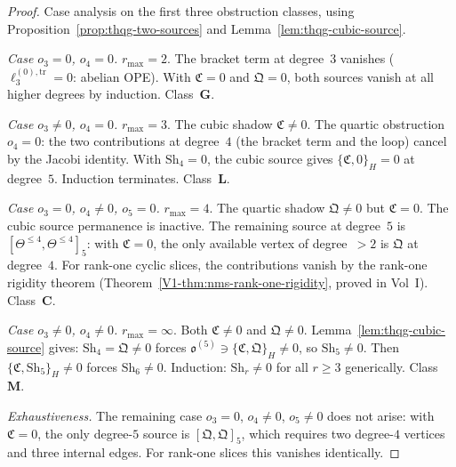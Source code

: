 \begin{proof}
Case analysis on the first three obstruction classes, using
Proposition~\ref{prop:thqg-two-sources} and
Lemma~\ref{lem:thqg-cubic-source}.

\smallskip
\noindent\emph{Case $o_3 = 0$, $o_4 = 0$.}
$r_{\max} = 2$. The bracket term at degree~$3$ vanishes
($\ell_3^{(0),\mathrm{tr}} = 0$: abelian OPE).
With $\mathfrak{C} = 0$ and $\mathfrak{Q} = 0$, both
sources vanish at all higher degrees by induction.
Class~$\mathbf{G}$.

\smallskip
\noindent\emph{Case $o_3 \neq 0$, $o_4 = 0$.}
$r_{\max} = 3$. The cubic shadow $\mathfrak{C} \neq 0$.
The quartic obstruction $o_4 = 0$: the two contributions
at degree~$4$ (the bracket term and the loop) cancel by
the Jacobi identity. With $\mathrm{Sh}_4 = 0$, the cubic
source gives $\{\mathfrak{C}, 0\}_H = 0$ at degree~$5$.
Induction terminates. Class~$\mathbf{L}$.

\smallskip
\noindent\emph{Case $o_3 = 0$, $o_4 \neq 0$, $o_5 = 0$.}
$r_{\max} = 4$. The quartic shadow $\mathfrak{Q} \neq 0$
but $\mathfrak{C} = 0$. The cubic source permanence is
inactive. The remaining source at degree~$5$ is
$[\Theta^{\leq 4}, \Theta^{\leq 4}]_5$: with
$\mathfrak{C} = 0$, the only available vertex of
degree~$> 2$ is $\mathfrak{Q}$ at degree~$4$. For
rank-one cyclic slices, the contributions vanish by the
rank-one rigidity theorem (Theorem~\ref{V1-thm:nms-rank-one-rigidity},
proved in Vol~I\@).
Class~$\mathbf{C}$.

\smallskip
\noindent\emph{Case $o_3 \neq 0$, $o_4 \neq 0$.}
$r_{\max} = \infty$. Both $\mathfrak{C} \neq 0$ and
$\mathfrak{Q} \neq 0$.
Lemma~\ref{lem:thqg-cubic-source} gives:
$\mathrm{Sh}_4 = \mathfrak{Q} \neq 0$ forces
$\mathfrak{o}^{(5)} \ni \{\mathfrak{C}, \mathfrak{Q}\}_H
\neq 0$, so $\mathrm{Sh}_5 \neq 0$. Then
$\{\mathfrak{C}, \mathrm{Sh}_5\}_H \neq 0$ forces
$\mathrm{Sh}_6 \neq 0$. Induction: $\mathrm{Sh}_r \neq 0$
for all $r \geq 3$ generically. Class~$\mathbf{M}$.

\smallskip
\noindent\emph{Exhaustiveness.}
The remaining case $o_3 = 0$, $o_4 \neq 0$, $o_5 \neq 0$
does not arise: with $\mathfrak{C} = 0$, the only degree-$5$
source is $[\mathfrak{Q}, \mathfrak{Q}]_5$, which requires
two degree-$4$ vertices and three internal edges. For
rank-one slices this vanishes identically.
\end{proof}



